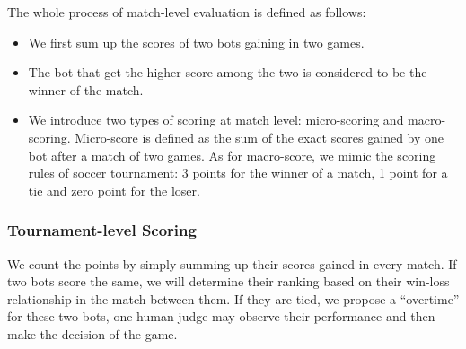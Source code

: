  The whole process of match-level evaluation is defined as follows: 
\begin{itemize}
\item  We first sum up the scores of two bots gaining in two games.

\item The bot that get the higher score among the two is considered to be the winner of 
the match. 
 
\item We introduce two types of scoring at match level: 
micro-scoring and macro-scoring. Micro-score is defined as the 
sum of the exact scores gained by one bot after a match of two games. 
As for macro-score, we mimic the scoring rules of soccer tournament: 
3 points for the winner of a match, 1 point for a tie and 
zero point for the loser. 

\end{itemize}

\subsubsection*{Tournament-level Scoring}
We count the points by simply summing up their scores gained in every match. If two bots score the same, we will determine their ranking based on their win-loss relationship in the match between them.  If they are tied, we propose a “overtime” for these two bots, one human judge may observe their performance and then make the decision of the game.



